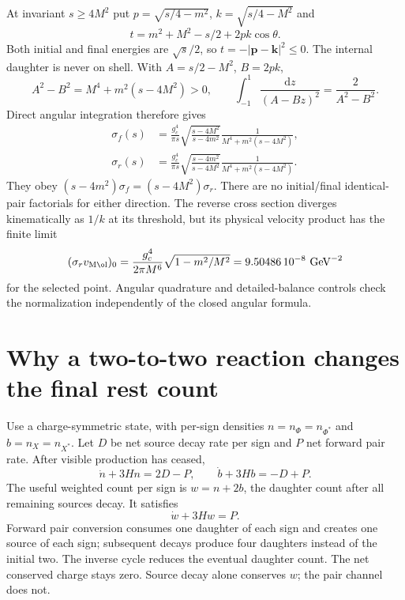 \documentclass[11pt]{article}
\newcommand{\dd}{\mathrm d}
\begin{document}
At invariant $s\ge4M^2$ put
$p=\sqrt{s/4-m^2}$, $k=\sqrt{s/4-M^2}$ and
\begin{equation}
 t=m^2+M^2-s/2+2pk\cos\theta.
\end{equation}
Both initial and final energies are $\sqrt s/2$, so
$t=-|\mathbf p-\mathbf k|^2\le0$. The internal daughter is never on shell.
With $A=s/2-M^2$, $B=2pk$,
\begin{equation}
 A^2-B^2=M^4+m^2(s-4M^2)>0,\qquad
 \int_{-1}^1\frac{\dd z}{(A-Bz)^2}=\frac2{A^2-B^2}.
\end{equation}
Direct angular integration therefore gives
\begin{align}
 \sigma_f(s)&=\frac{g_c^4}{\pi s}
 \sqrt{\frac{s-4M^2}{s-4m^2}}
 \frac1{M^4+m^2(s-4M^2)},\\
 \sigma_r(s)&=\frac{g_c^4}{\pi s}
 \sqrt{\frac{s-4m^2}{s-4M^2}}
 \frac1{M^4+m^2(s-4M^2)}.
\end{align}
They obey
$(s-4m^2)\sigma_f=(s-4M^2)\sigma_r$.
There are no initial/final identical-pair factorials for either direction.
The reverse cross section diverges kinematically as $1/k$ at its threshold,
but its physical velocity product has the finite limit
\begin{equation}
 (\sigma_r v_{\rm M\o l})_0
 =\frac{g_c^4}{2\pi M^6}\sqrt{1-m^2/M^2}
 =9.50486\,10^{-8}\ \mathrm{GeV}^{-2}
\end{equation}
for the selected point. Angular quadrature and detailed-balance controls
check the normalization independently of the closed angular formula.

\section{Why a two-to-two reaction changes the final rest count}
Use a charge-symmetric state, with per-sign densities $n=n_\Phi=n_{\Phi^*}$
and $b=n_X=n_{X^*}$. Let $D$ be net source decay rate per sign and $P$
net forward pair rate. After visible production has ceased,
\begin{equation}
 \dot n+3Hn=2D-P,\qquad
 \dot b+3Hb=-D+P.
\end{equation}
The useful weighted count per sign is $w=n+2b$, the daughter count after
all remaining sources decay. It satisfies
\begin{equation}
 \boxed{\dot w+3Hw=P.}
\end{equation}
Forward pair conversion consumes one daughter of each sign and creates
one source of each sign; subsequent decays produce four daughters instead
of the initial two. The inverse cycle reduces the eventual daughter count.
The net conserved charge stays zero. Source decay alone conserves $w$;
the pair channel does not.
\end{document}
